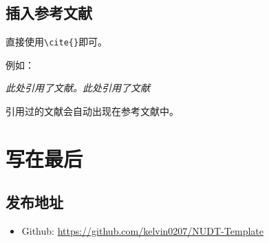 \documentclass[12pt,hyperref,a4paper,UTF8,fontset=fandol]{ctexart}
\begin{document}
\subsection{插入参考文献}
直接使用\verb|\cite{}|即可。

例如：


   \textit{ 此处引用了文献\cite{OFDMAbackscatter}。此处引用了文献\cite{DigiScatter}}


引用过的文献会自动出现在参考文献中。

\section{写在最后}
\subsection{发布地址}
\begin{itemize}
    \item Github: \url{https://github.com/kelvin0207/NUDT-Template}
\end{itemize}


\end{document}
